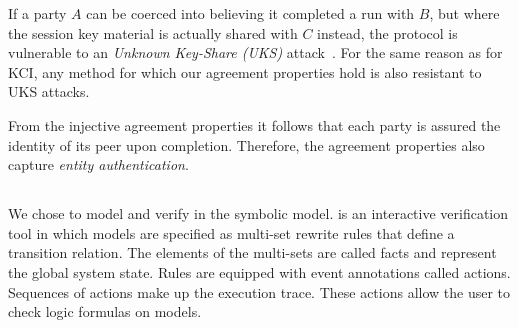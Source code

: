If a party $A$ can be coerced into believing it completed a run with $B$, but
where the session key material is actually shared with $C$ instead, the 
protocol is vulnerable to an \emph{Unknown Key-Share (UKS)}
attack~\cite{DBLP:conf/ima/Blake-WilsonJM97}.
%
For the same reason as for KCI, any method for which our agreement
properties hold is also resistant to UKS attacks.
%

From the injective agreement properties it follows that each party is assured
the identity of its peer upon completion.
%
Therefore, the agreement properties also capture \emph{entity authentication}.
%

%

\subsection{\mTamarin{}}
\label{sec:tamarin}
We chose \mTamarin{} to model and verify \mEdhoc{} in the symbolic model.
%
\mTamarin{} is an interactive verification tool in which models are specified
as multi-set rewrite rules that define a transition relation.
%
The elements of the multi-sets are called facts and represent the global system
state.
%
Rules are equipped with event annotations called actions. Sequences of actions make up the execution trace.
%
These actions allow the user to check logic formulas on models.
%
%

